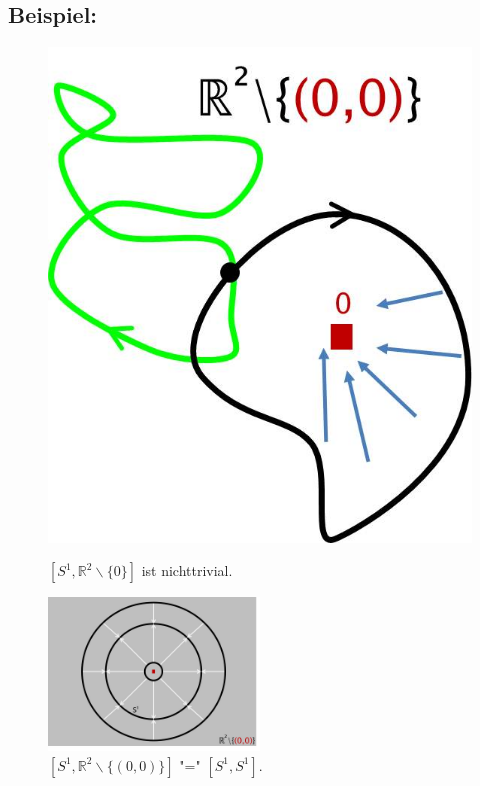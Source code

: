 \documentclass[a4paper,11pt,notitlepage]{report}
\theoremstyle{definition}
\newcommand{\R}{{\ensuremath{\mathbb{R}}}}
\newenvironment{bsp}[1]
{
\setlength{\fboxsep}{10pt}
\subsection*{Beispiel: #1}
\begin{upshape}
}
{
\end{upshape}
}
\begin{document}
\begin{bsp}{}
\begin{figure}[h]
\centering
\begin{minipage}[b]{6cm}\includegraphics[scale=0.4]{images/Homotop_Schleifen_R_ohne_0.jpg}
\caption{$[S^1, \R^2 \backslash \{0\}]$ ist nichttrivial.}
\end{minipage}

\begin{minipage}[b]{6cm}\includegraphics[width=0.5\textwidth]{images/S1_und_R2_ohne_0.jpg}
\caption{$[S^1,\R^2\backslash\{(0,0)\}]\text{ "=" }[S^1,S^1]$.}
\end{minipage}

\end{figure}
\end{bsp}
\end{document}
